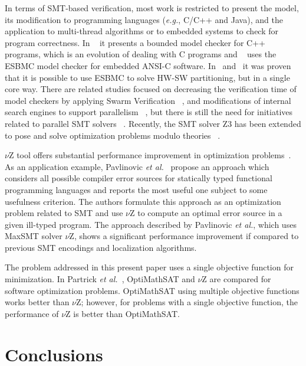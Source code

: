 In terms of SMT-based verification, most work is restricted to present the model, its modification to programming languages ({\it e.g.}, C/C++ and Java), and the application to multi-thread algorithms or to embedded systems to check for program correctness. In ~\cite{Ramalho2013} it presents a bounded model checker for C++ programs, which is an evolution of dealing with C programs and ~\cite{Cordeiro2012} uses the ESBMC model checker for embedded ANSI-C software. In~\cite{Trindade2015} and~\cite{Trindade2014} it was proven that it is possible to use ESBMC to solve HW-SW partitioning, but in a single core way. There are related studies focused on decreasing the verification time of model checkers by applying Swarm Verification ~\cite{Holzmann2011}, and modifications of internal search engines to support parallelism ~\cite{Holzmann2012}, but there is still the need for initiatives related to parallel SMT solvers ~\cite{Wintersteiger2009}. Recently, the SMT solver Z3 has been extended to pose and solve optimization problems modulo theories ~\cite{Bjorner2015}.

$\nu$Z tool offers substantial performance improvement in optimization problems~\cite{Bjorner2014,Bjorner2015}. As an application example, Pavlinovic {\it et al.}~\cite{Pavlinovic2015} propose an approach which considers all possible compiler error sources for statically typed functional programming languages and reports the most useful one subject to some usefulness criterion. The authors formulate this approach as an optimization problem related to SMT and use $\nu$Z to compute an optimal error source in a given ill-typed program. The approach described by Pavlinovic {\it et al.}, which uses MaxSMT solver $\nu$Z, shows a significant performance improvement if compared to previous SMT encodings and localization algorithms.

The problem addressed in this present paper uses a single objective function for minimization. In Partrick {\it et al.}~\cite{Patrick2015},  OptiMathSAT and $\nu$Z are compared for software optimization problems. OptiMathSAT using multiple objective functions works better than $\nu$Z; however, for problems with a single objective function, the performance of $\nu$Z is better than OptiMathSAT.

\section{Conclusions}
\label{Conclusions}

